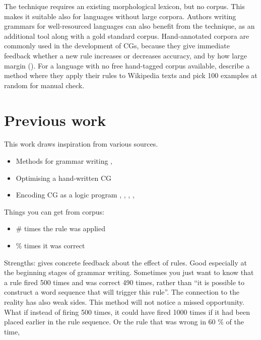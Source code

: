 The technique requires an existing morphological lexicon, but no corpus.
This makes it suitable also for languages without large corpora.
Authors writing grammars for well-resourced languages can also benefit from the technique, as an additional tool along with a gold standard corpus. 
Hand-annotated corpora are commonly used in the development of CGs, because they give immediate feedback whether a new rule increases or decreases accuracy, and by how large margin (\cite{voutilainen2004}). For a language with no free hand-tagged corpus available, \cite{tyers_reynolds2015} describe a method where they apply their rules to Wikipedia texts and pick 100 examples at random for manual check.

\section{Previous work}

This work draws inspiration from various sources.

\begin{itemize}
\item Methods for grammar writing \cite{voutilainen2004},  \cite{tyers_reynolds2015}
\item Optimising a hand-written CG \cite{bick2013tuning}
\item Encoding CG as a logic program \cite{lager98}, \cite{lindberg_eineborg98ilp},  \cite{lager01transformation}, \cite{asfrent14}, \cite{listenmaa_claessen2015}
\end{itemize}

Things you can get from corpus:

\begin{itemize}
\item \# times the rule was applied
\item \% times it was correct
\end{itemize}
Strengths: gives concrete feedback about the effect of rules. 
Good especially at the beginning stages of grammar writing. 
Sometimes you just want to know that a rule fired 500 times and was correct 490 times, rather than ``it is possible to construct a word sequence that will trigger this rule''.
The connection to the reality has also weak sides. This method will not notice a missed opportunity. What if instead of firing 500 times, it could have fired 1000 times if it had been placed earlier in the rule sequence.
Or the rule that was wrong in 60 \% of the time,


